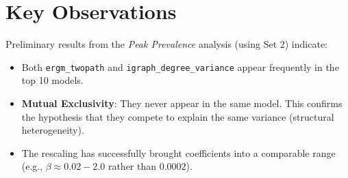 \documentclass{article}
\begin{document}
\section{Key Observations}
Preliminary results from the \textit{Peak Prevalence} analysis (using Set 2) indicate:
\begin{itemize}
    \item Both \texttt{ergm\_twopath} and \texttt{igraph\_degree\_variance} appear frequently in the top 10 models.
    \item \textbf{Mutual Exclusivity}: They never appear in the same model. This confirms the hypothesis that they compete to explain the same variance (structural heterogeneity).
    \item The rescaling has successfully brought coefficients into a comparable range (e.g., $\beta \approx 0.02 - 2.0$ rather than $0.0002$).
\end{itemize}
\end{document}
